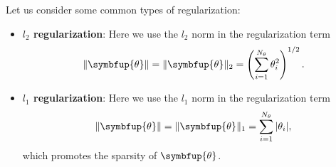 \documentclass[11pt]{extarticle}
\theoremstyle{definition}
\newcommand{\btheta}{\symbfup{\theta}}
\begin{document}
Let us consider some common types of regularization:
\begin{itemize}
\item \textbf{$l_2$ regularization}: Here we use the $l_2$ norm in the regularization term
\begin{align*}
\| \btheta \| = \|\btheta\|_2 = \left(\sum_{i=1}^{N_\theta} \theta_i^2\right)^{1/2}.
\end{align*}	
\item \textbf{$l_1$ regularization}: Here we use the $l_1$ norm in the regularization term
\begin{align*}
\| \btheta \| = \|\btheta\|_1 = \sum_{i=1}^{N_\theta} |\theta_i|,
\end{align*}
which promotes the sparsity of $\btheta$.
\end{itemize}
\end{document}
